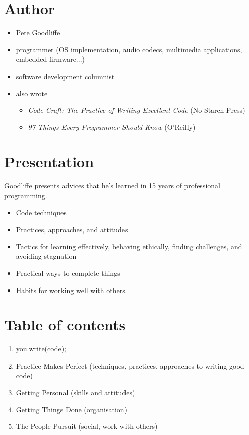 \documentclass{mypresentation}
\begin{document}


\section{Author}
\begin{itemize}
\item Pete Goodliffe
\item programmer (OS implementation, audio codecs, multimedia applications, embedded firmware...)
\item software development columnist
\item also wrote
	\begin{itemize}
	\item \textit{Code Craft: The Practice of Writing Excellent Code} (No Starch Press)
	\item \textit{97 Things Every Programmer Should Know} (O'Reilly)
	\end{itemize}
\end{itemize}
\newpage


\section{Presentation}
Goodliffe presents advices that he’s learned in 15 years of professional programming.
\begin{itemize}
\item Code techniques 
\item Practices, approaches, and attitudes
\item Tactics for learning effectively, behaving ethically, finding challenges, and avoiding stagnation
\item Practical ways to complete things
\item Habits for working well with others
\end{itemize}
\newpage


\section{Table of contents}
\begin{enumerate}
\item you.write(code);
\item Practice Makes Perfect (techniques, practices, approaches to writing good code)
\item Getting Personal (skills and attitudes)
\item Getting Things Done (organisation)
\item The People Pursuit (social, work with others)
\end{enumerate}
\end{document}
